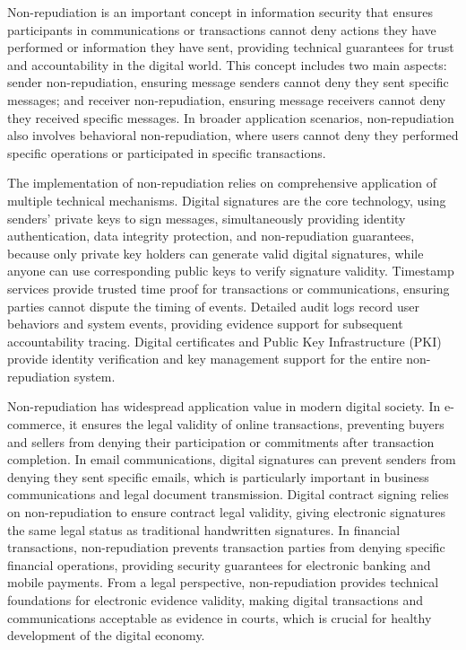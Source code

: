 \documentclass[12pt,a4paper]{article}
\begin{document}
Non-repudiation is an important concept in information security that ensures participants in communications or transactions cannot deny actions they have performed or information they have sent, providing technical guarantees for trust and accountability in the digital world. This concept includes two main aspects: sender non-repudiation, ensuring message senders cannot deny they sent specific messages; and receiver non-repudiation, ensuring message receivers cannot deny they received specific messages. In broader application scenarios, non-repudiation also involves behavioral non-repudiation, where users cannot deny they performed specific operations or participated in specific transactions.

The implementation of non-repudiation relies on comprehensive application of multiple technical mechanisms. Digital signatures are the core technology, using senders' private keys to sign messages, simultaneously providing identity authentication, data integrity protection, and non-repudiation guarantees, because only private key holders can generate valid digital signatures, while anyone can use corresponding public keys to verify signature validity. Timestamp services provide trusted time proof for transactions or communications, ensuring parties cannot dispute the timing of events. Detailed audit logs record user behaviors and system events, providing evidence support for subsequent accountability tracing. Digital certificates and Public Key Infrastructure (PKI) provide identity verification and key management support for the entire non-repudiation system.

Non-repudiation has widespread application value in modern digital society. In e-commerce, it ensures the legal validity of online transactions, preventing buyers and sellers from denying their participation or commitments after transaction completion. In email communications, digital signatures can prevent senders from denying they sent specific emails, which is particularly important in business communications and legal document transmission. Digital contract signing relies on non-repudiation to ensure contract legal validity, giving electronic signatures the same legal status as traditional handwritten signatures. In financial transactions, non-repudiation prevents transaction parties from denying specific financial operations, providing security guarantees for electronic banking and mobile payments. From a legal perspective, non-repudiation provides technical foundations for electronic evidence validity, making digital transactions and communications acceptable as evidence in courts, which is crucial for healthy development of the digital economy.
\end{document}
